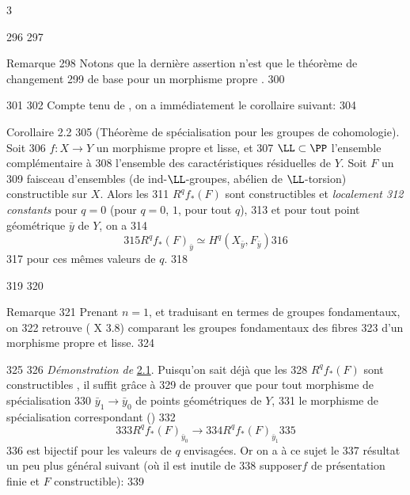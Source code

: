 3	\documentclass[10pt]{../fichiers-configuration-latex/smfart}
\begin{document}
   296	
   297	\begin{enonce*}[remark]{Remarque}
   298	Notons que la dernière assertion n'est que le théorème de changement
   299	de base pour un morphisme propre .
   300	\end{enonce*}
   301	
   302	Compte tenu de , on a immédiatement le corollaire suivant:	
   304	\begin{enonce*}{Corollaire 2.2}
   305	(Théorème de spécialisation pour les groupes de cohomologie). Soit
   306	  $f:X\rightarrow Y$ un morphisme propre et lisse, et
   307	  $\LL\subset \PP$ l'ensemble complémentaire à
   308	  l'ensemble des caractéristiques résiduelles de $Y$. Soit $F$ un
   309	  faisceau d'ensembles (\resp de ind-$\LL$-groupes, 	  abélien de $\LL$-torsion) constructible sur $X$. Alors les
   311	  $R^{q}f_{\ast}(F)$ sont constructibles et \emph{localement
   312	  constants} pour $q=0$ (\resp pour $q=0$, $1$, \resp pour tout $q$),
   313	  et pour tout point géométrique $\bar{y}$ de $Y$, on a
   314	$$
   315	R^{q}f_{\ast}(F)_{\bar{y}}\simeq H^{q}(X_{\bar{y}},F_{\bar{y}})
   316	$$
   317	pour ces mêmes valeurs de $q$.
   318	\end{enonce*}
   319	
   320	\begin{enonce*}[remark]{Remarque}
   321	Prenant $n=1$, et traduisant en termes de groupes fondamentaux, on
   322	retrouve ( X 3.8) comparant les groupes fondamentaux des fibres
   323	d'un morphisme propre et lisse.
   324	\end{enonce*}
   325	
   326		\emph{Démonstration de} \hyperref[XVI.thm2.1]{2.1}. Puisqu'on sait déjà que les
   328	$R^{q}f_{\ast}(F)$ sont constructibles , il suffit grâce à 
   329	 de prouver que pour tout morphisme de spécialisation
   330	$\bar{y}_1\rightarrow \bar{y}_{0}$ de points géométriques de $Y$,
   331	le morphisme de spécialisation correspondant ()
   332	\begin{equation*}
   333	R^{q}f_{\ast}(F)_{\bar{y}_{0}}\longrightarrow
   334	R^{q}f_{\ast}(F)_{\bar{y}_1}\tag{$\ast$}
   335	\end{equation*}
   336	est bijectif pour les valeurs de $q$ envisagées. Or on a à ce sujet le
   337	résultat un peu plus général suivant (où il est inutile de
   338	supposer\pageoriginale $f$ de présentation finie et $F$ constructible):
   339	
\end{document}
